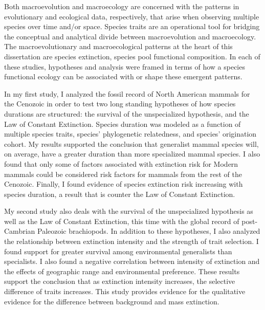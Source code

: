 \abstract

Both macroevolution and macroecology are concerned with the patterns in evolutionary and ecological data, respectively, that arise when observing multiple species over time and/or space. Species traits are an operational tool for bridging the conceptual and analytical divide between macroevolution and macroecology. The macroevolutionary and macroecological patterns at the heart of this dissertation are species extinction, species pool functional composition. In each of these studies, hypotheses and analysis were framed in terms of how a species functional ecology can be associated with or shape these emergent patterns. 

In my first study, I analyzed the fossil record of North American mammals for the Cenozoic in order to test two long standing hypotheses of how species durations are structured: the survival of the unspecialized hypothesis, and the Law of Constant Extinction. Species duration was modeled as a function of multiple species traits, species' phylogenetic relatedness, and species' origination cohort. My results supported the conclusion that generalist mammal species will, on average, have a greater duration than more specialized mammal species. I also found that only some of factors associated with extinction risk for Modern mammals could be considered risk factors for mammals from the rest of the Cenozoic. Finally, I found evidence of species extinction risk increasing with species duration, a result that is counter the Law of Constant Extinction.

My second study also deals with the survival of the unspecialized hypothesis as well as the Law of Constant Extinction, this time with the global record of post-Cambrian Paleozoic brachiopods. In addition to these hypotheses, I also analyzed the relationship between extinction intensity and the strength of trait selection. I found support for greater survival among environmental generalists than specialists. I also found a negative correlation between intensity of extinction and the effects of geographic range and environmental preference. These results support the conclusion that as extinction intensity increases, the selective difference of traits increases. This study provides evidence for the qualitative evidence for the difference between background and mass extinction.

